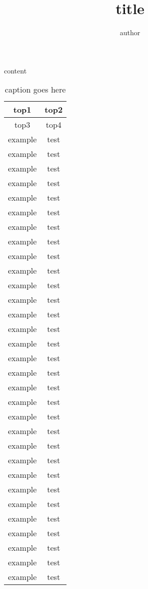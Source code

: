 \documentclass[a4paper, 11pt]{article}
\begin{document}
\begin{CJK*}{GBK}{song}
\CJKindent

\title{title}
\author{author}
\date{}
\maketitle
content
\begin{longtable}{|c|c|}
\caption{caption goes here}\\
\hline
\toprule
\hline
top1 & top2 \\
\hline
\endfirsthead %
\hline
top3 & top4 \\
\hline
\endhead %
\hline
\endfoot %
\endlastfoot
example & test \\
example & test \\
example & test \\
example & test \\
example & test \\
example & test \\
example & test \\
example & test \\
example & test \\
example & test \\
example & test \\
example & test \\
example & test \\
example & test \\
example & test \\
example & test \\
example & test \\
example & test \\
example & test \\
example & test \\
example & test \\
example & test \\
example & test \\
example & test \\
example & test \\
example & test \\
example & test \\
example & test \\
example & test \\
example & test \\
example & test \\

\end{longtable}
\end{CJK*}
\end{document}
